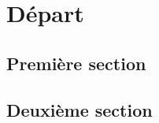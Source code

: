 \documentclass[11pt, a4paper]{report}
\begin{document}
\tableofcontents

\chapter{Départ}
\minitoc\pagebreak

\section{Première section}
\lipsum[1]

\section{Deuxième section}
\lipsum[2]
\end{document}
